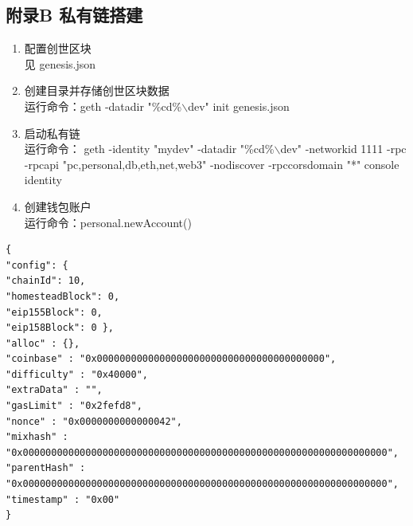 \documentclass[a4paper,12pt,titlepage]{ctexart}
\begin{document}
\subsection*{附录B 私有链搭建}
\begin{enumerate}
\item 配置创世区块\\见 genesis.json
\item 创建目录并存储创世区块数据\\
运行命令：geth -datadir "\%cd\%$\backslash$dev" init genesis.json
\item 启动私有链\\
运行命令：
geth -identity "mydev" -datadir "\%cd\%$\backslash$dev" -networkid 1111 -rpc -rpcapi "pc,personal,db,eth,net,web3" -nodiscover -rpccorsdomain "*" console
identity

\item 创建钱包账户\\
运行命令：personal.newAccount()
\end{enumerate}
\begin{footnotesize}
\begin{verbatim}
{ 
"config": { 
"chainId": 10, 
"homesteadBlock": 0, 
"eip155Block": 0, 
"eip158Block": 0 }, 
"alloc" : {}, 
"coinbase" : "0x0000000000000000000000000000000000000000", 
"difficulty" : "0x40000", 
"extraData" : "", 
"gasLimit" : "0x2fefd8", 
"nonce" : "0x0000000000000042", 
"mixhash" : "0x0000000000000000000000000000000000000000000000000000000000000000", 
"parentHash" : "0x0000000000000000000000000000000000000000000000000000000000000000", 
"timestamp" : "0x00" 
}
\end{verbatim}
\end{footnotesize}
\newpage
\setcounter{page}{1}
\end{document}

